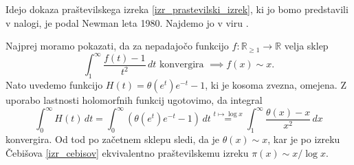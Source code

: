 Idejo dokaza praštevilskega izreka \ref{izr_prastevilski_izrek}, ki jo bomo predstavili v nalogi, je podal Newman leta 1980. Najdemo jo v viru \cite[str.~9]{mit_lecture_notes_2021}. %
\begin{skica}
Najprej moramo pokazati, da za nepadajočo funkcijo $f : \mathbb{R}_{\ge  1} \to \mathbb{R}$
velja sklep \begin{equation*}
\int_{1}^{\infty} \frac{f(t) - 1}{t^2} \, dt \text{ konvergira } \implies f(x) \sim x. 
\end{equation*}  
  Nato uvedemo funkcijo $H(t) = \theta(e^{t} )e^{-t} - 1$, ki je kosoma zvezna, omejena. Z uporabo lastnosti holomorfnih funkcij ugotovimo, da integral \begin{equation*}
  \int_{0}^{\infty} H(t)   \, dt = \int_{0}^{\infty} (\theta(e^{t} )e^{-t} - 1)  \, dt  \stackrel{t \mapsto \log x}{=} \int_{1}^{\infty}  \frac{\theta(x) -x }{x^2} \, dx 
  \end{equation*}  
   konvergira. Od tod po začetnem sklepu sledi, da je $\theta(x) \sim x$, kar je po izreku Čebišova \ref{izr_cebisov} ekvivalentno praštevilskemu izreku $\pi(x) \sim x / \log x$.  
\end{skica}



